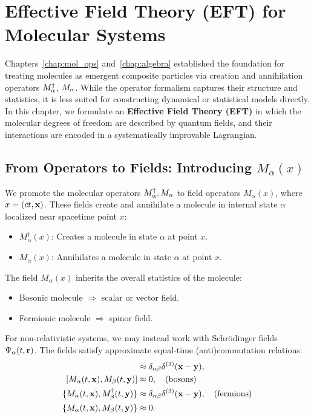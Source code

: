 
\chapter{Effective Field Theory (EFT) for Molecular Systems}
\label{chap:eft}

Chapters~\ref{chap:mol_ops} and~\ref{chap:algebra} established the foundation for treating molecules as emergent composite particles via creation and annihilation operators \(M^\dagger_{\alpha}\), \(M_{\alpha}\). While the operator formalism captures their structure and statistics, it is less suited for constructing dynamical or statistical models directly. In this chapter, we formulate an \textbf{Effective Field Theory (EFT)} in which the molecular degrees of freedom are described by quantum fields, and their interactions are encoded in a systematically improvable Lagrangian.

\section{From Operators to Fields: Introducing \texorpdfstring{\(M_\alpha(x)\)}{Malpha(x)}}
\label{sec:eft_fields}

We promote the molecular operators \(M^\dagger_{\alpha}, M_{\alpha}\) to field operators \(M_\alpha(x)\), where \(x = (ct, \vb{x})\). These fields create and annihilate a molecule in internal state \(\alpha\) localized near spacetime point \(x\):
\begin{itemize}
	\item \(M^\dagger_\alpha(x)\): Creates a molecule in state \(\alpha\) at point \(x\).
	\item \(M_\alpha(x)\): Annihilates a molecule in state \(\alpha\) at point \(x\).
\end{itemize}

The field \(M_\alpha(x)\) inherits the overall statistics of the molecule:
\begin{itemize}
	\item Bosonic molecule \(\Rightarrow\) scalar or vector field.
	\item Fermionic molecule \(\Rightarrow\) spinor field.
\end{itemize}

For non-relativistic systems, we may instead work with Schrödinger fields \(\Psi_\alpha(t, \vb{r})\). The fields satisfy approximate equal-time (anti)commutation relations:
\begin{align}
	[M_\alpha(t, \vb{x}), M^\dagger_\beta(t, \vb{y})] &\approx \delta_{\alpha\beta} \delta^{(3)}(\vb{x} - \vb{y}), \\
	[M_\alpha(t, \vb{x}), M_\beta(t, \vb{y})] &\approx 0, \quad \text{(bosons)} \\
	\{M_\alpha(t, \vb{x}), M^\dagger_\beta(t, \vb{y})\} &\approx \delta_{\alpha\beta} \delta^{(3)}(\vb{x} - \vb{y}), \quad \text{(fermions)} \\
	\{M_\alpha(t, \vb{x}), M_\beta(t, \vb{y})\} &\approx 0.
\end{align}

